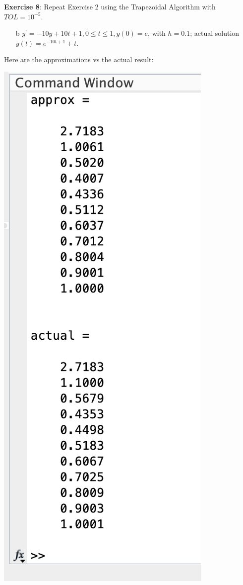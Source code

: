 \documentclass{article}
\begin{document}
\textbf{Exercise 8}: Repeat Exercise $2$ using the Trapezoidal Algorithm with $TOL = 10^{-5}$.
    \begin{itemize}
        \item [b] $y^{\prime} = -10y + 10t + 1, 0 \leq t \leq 1, y(0) = e$, with $h  = 0.1$; actual solution $y(t) = e^{-10t + 1} + t$.
    \end{itemize}
    \begin{answer}
        Here are the approximations vs the actual result:
        \begin{center}
            \includegraphics[scale=0.5]{q7}

\end{center}
\end{answer}
\end{document}
